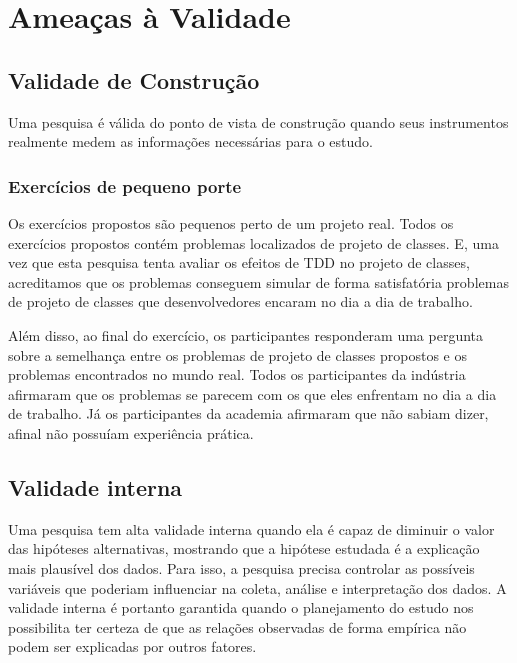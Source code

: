 \chapter{Ameaças à Validade}
\label{cap:ameacas}

\section{Validade de Construção}

Uma pesquisa é válida do ponto de vista de construção quando seus instrumentos realmente
medem as informações necessárias para o estudo.

\subsection{Exercícios de pequeno porte}

Os exercícios propostos são pequenos perto de um projeto real. Todos os exercícios propostos contém
problemas localizados de projeto de classes. E, uma vez que esta pesquisa tenta avaliar os efeitos de TDD no projeto de classes, 
acreditamos que os problemas conseguem simular de forma satisfatória
problemas de projeto de classes que desenvolvedores encaram no dia a dia de trabalho.

Além disso, ao final do exercício, os participantes responderam uma pergunta sobre a semelhança
entre os problemas de projeto de classes propostos e os problemas encontrados no mundo real.
Todos os participantes da indústria afirmaram que os problemas se parecem com os que eles enfrentam
no dia a dia de trabalho. Já os participantes da academia afirmaram que não sabiam dizer, afinal não
possuíam experiência prática.

\section{Validade interna}

Uma pesquisa tem alta validade interna quando ela é capaz de diminuir o valor das hipóteses alternativas, mostrando
que a hipótese estudada é a explicação mais plausível dos dados. Para isso, a pesquisa precisa controlar as possíveis
variáveis que poderiam influenciar na coleta, análise e interpretação dos dados. A validade interna é portanto
garantida quando o planejamento do estudo nos possibilita ter certeza de que as relações observadas de
forma empírica não podem ser explicadas por outros fatores.

